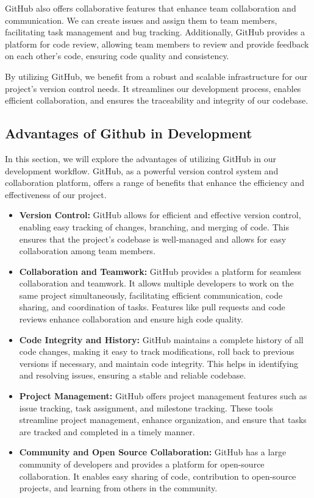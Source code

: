GitHub also offers collaborative features that enhance team collaboration and communication. We can create issues and assign them to team members, facilitating task management and bug tracking. Additionally, GitHub provides a platform for code review, allowing team members to review and provide feedback on each other's code, ensuring code quality and consistency.

By utilizing GitHub, we benefit from a robust and scalable infrastructure for our project's version control needs. It streamlines our development process, enables efficient collaboration, and ensures the traceability and integrity of our codebase.
\subsection{Advantages of Github in Development}
In this section, we will explore the advantages of utilizing GitHub in our development workflow. GitHub, as a powerful version control system and collaboration platform, offers a range of benefits that enhance the efficiency and effectiveness of our project.

\begin{itemize}
\item \textbf{Version Control:} GitHub allows for efficient and effective version control, enabling easy tracking of changes, branching, and merging of code. This ensures that the project's codebase is well-managed and allows for easy collaboration among team members.

\item \textbf{Collaboration and Teamwork:} GitHub provides a platform for seamless collaboration and teamwork. It allows multiple developers to work on the same project simultaneously, facilitating efficient communication, code sharing, and coordination of tasks. Features like pull requests and code reviews enhance collaboration and ensure high code quality.

\item \textbf{Code Integrity and History:} GitHub maintains a complete history of all code changes, making it easy to track modifications, roll back to previous versions if necessary, and maintain code integrity. This helps in identifying and resolving issues, ensuring a stable and reliable codebase.

\item \textbf{Project Management:} GitHub offers project management features such as issue tracking, task assignment, and milestone tracking. These tools streamline project management, enhance organization, and ensure that tasks are tracked and completed in a timely manner.

\item \textbf{Community and Open Source Collaboration:} GitHub has a large community of developers and provides a platform for open-source collaboration. It enables easy sharing of code, contribution to open-source projects, and learning from others in the community.
\end{itemize}
